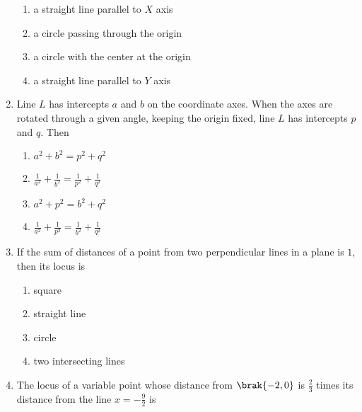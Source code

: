 \begin{enumerate}
\begin{multicols}{2}
\begin{enumerate}
    \item a straight line parallel to $X$ axis
    \item a circle passing through the origin
    \item a circle with the center at the origin 
    \item a straight line parallel to $Y$ axis 
\end{enumerate}
\end{multicols}
\item Line $L$ has intercepts $a$ and $b$ on the coordinate axes. When the axes are rotated through a given angle, keeping the origin fixed, line $L$ has intercepts $p$ and $q$. Then

\hfill {}
\begin{multicols}{2}
\begin{enumerate}
    \item $a^2+b^2=p^2+q^2$
    \item $\frac{1}{a^2}+\frac{1}{b^2}=\frac{1}{p^2}+\frac{1}{q^2}$
    \item $a^2+p^2=b^2+q^2$
    \item $\frac{1}{a^2}+\frac{1}{p^2}=\frac{1}{b^2}+\frac{1}{q^2}$
\end{enumerate}
\end{multicols}
\item If the sum of distances of a point from two perpendicular lines in a plane is $1$, then its locus is
\hfill {}
\begin{multicols}{2}
\begin{enumerate}
        \item square
        \item straight line
        \item circle
        \item two intersecting lines
\end{enumerate}
\end{multicols}
\item The locus of a variable point whose distance from $\brak{-2,0}$ is $\frac{2}{3}$ times its distance from the line $x=-\frac{9}{2}$ is
\hfill {}
\begin{multicols}{2}
\begin{enumerate}
    

\end{enumerate}
\end{multicols}
\end{enumerate}
